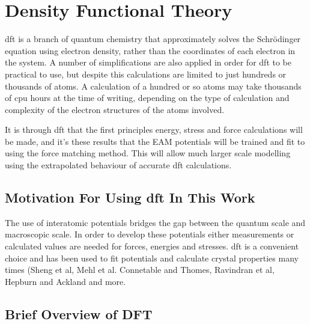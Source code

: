 




\section{Density Functional Theory}

\Acrfull{dft} is a branch of quantum chemistry that approximately solves the Schr\"{o}dinger equation using electron density, rather than the coordinates of each electron in the system.  A number of simplifications are also applied in order for \acrshort{dft} to be practical to use, but despite this calculations are limited to just hundreds or thousands of atoms.  A calculation of a hundred or so atoms may take thousands of \acrshort{cpu} hours at the time of writing, depending on the type of calculation and complexity of the electron structures of the atoms involved.

It is through \acrshort{dft} that the first principles energy, stress and force calculations will be made, and it's these results that the EAM potentials will be trained and fit to using the force matching method.  This will allow much larger scale modelling using the extrapolated behaviour of accurate \acrshort{dft} calculations.



\FloatBarrier
\subsection{Motivation For Using \acrshort{dft} In This Work}

The use of interatomic potentials bridges the gap between the quantum scale and macroscopic scale.  In order to develop these potentials either measurements or calculated values are needed for forces, energies and stresses.  \acrshort{dft} is a convenient choice and has been used to fit potentials and calculate crystal properties many times (Sheng et al\cite{shengeam}, Mehl et al.\cite{mehlsp} Connetable and Thomes,\cite{orthonisi} Ravindran et al\cite{dfttisiravindran}, Hepburn and Ackland\cite{hepburnfec} and more.


\FloatBarrier
\subsection{Brief Overview of DFT}

